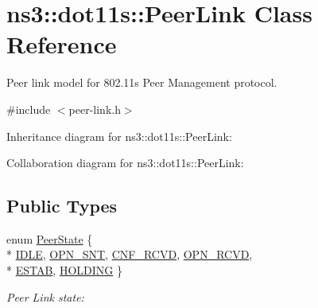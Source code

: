 \hypertarget{classns3_1_1dot11s_1_1PeerLink}{}\section{ns3\+:\+:dot11s\+:\+:Peer\+Link Class Reference}
\label{classns3_1_1dot11s_1_1PeerLink}


Peer link model for 802.\+11s Peer Management protocol.  




{\ttfamily \#include $<$peer-\/link.\+h$>$}



Inheritance diagram for ns3\+:\+:dot11s\+:\+:Peer\+Link\+:


Collaboration diagram for ns3\+:\+:dot11s\+:\+:Peer\+Link\+:
\subsection*{Public Types}
\begin{DoxyCompactItemize}
\item 
enum \hyperlink{classns3_1_1dot11s_1_1PeerLink_a432024c7d584aebae1ee15aa88ffb06d}{Peer\+State} \{ \\*
\hyperlink{classns3_1_1dot11s_1_1PeerLink_a432024c7d584aebae1ee15aa88ffb06da9aa6801dc26db30fbdb4d89847ad912a}{I\+D\+LE}, 
\hyperlink{classns3_1_1dot11s_1_1PeerLink_a432024c7d584aebae1ee15aa88ffb06daa1089dc3061e5fbe15a9693bb6480656}{O\+P\+N\+\_\+\+S\+NT}, 
\hyperlink{classns3_1_1dot11s_1_1PeerLink_a432024c7d584aebae1ee15aa88ffb06da3a6a0efd6b688360adbbe0d2578e99dd}{C\+N\+F\+\_\+\+R\+C\+VD}, 
\hyperlink{classns3_1_1dot11s_1_1PeerLink_a432024c7d584aebae1ee15aa88ffb06dabb9fde9e2c12b30acf6bddb4f9ddb68b}{O\+P\+N\+\_\+\+R\+C\+VD}, 
\\*
\hyperlink{classns3_1_1dot11s_1_1PeerLink_a432024c7d584aebae1ee15aa88ffb06da9d6ed7d5e4a66f2a2964b4b77c1ef728}{E\+S\+T\+AB}, 
\hyperlink{classns3_1_1dot11s_1_1PeerLink_a432024c7d584aebae1ee15aa88ffb06dac5609fa8019ce1b47b4612621d5e56da}{H\+O\+L\+D\+I\+NG}
 \}\begin{DoxyCompactList}\small\item\em Peer Link state\+: \end{DoxyCompactList}
\end{DoxyCompactItemize}
